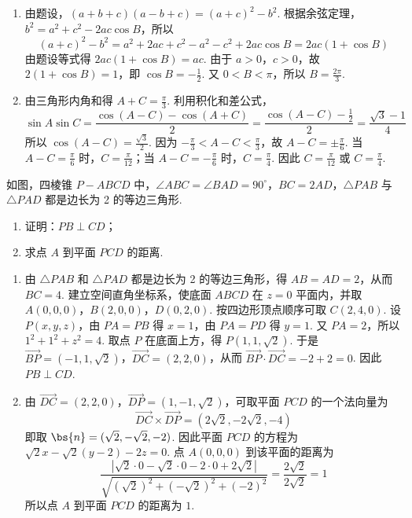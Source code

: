 \begin{solution}
\begin{enumerate}
\item 由题设，\((a+b+c)(a-b+c)=(a+c)^2-b^2\).
根据余弦定理，\(b^2=a^2+c^2-2ac\cos B\)，所以
\[
(a+c)^2-b^2=a^2+2ac+c^2-a^2-c^2+2ac\cos B=2ac(1+\cos B)
\]
由题设等式得 \(2ac(1+\cos B)=ac\).
由于 \(a>0\)，\(c>0\)，故 \(2(1+\cos B)=1\)，即 \(\cos B=-\frac{1}{2}\).
又 \(0<B<\pi\)，所以 \(B=\frac{2\pi}{3}\).

\item 由三角形内角和得 \(A+C=\frac{\pi}{3}\). 利用积化和差公式，
\[
\sin A\sin C=\frac{\cos(A-C)-\cos(A+C)}{2}=\frac{\cos(A-C)-\frac{1}{2}}{2}=\frac{\sqrt{3}-1}{4}
\]
所以 \(\cos(A-C)=\frac{\sqrt{3}}{2}\).
因为 \(-\frac{\pi}{3}<A-C<\frac{\pi}{3}\)，故 \(A-C=\pm\frac{\pi}{6}\).
当 \(A-C=\frac{\pi}{6}\) 时，\(C=\frac{\pi}{12}\)；当 \(A-C=-\frac{\pi}{6}\) 时，\(C=\frac{\pi}{4}\).
因此 \(C=\frac{\pi}{12}\) 或 \(C=\frac{\pi}{4}\).
\end{enumerate}
\end{solution}

\begin{problem}
如图，四棱锥 \(P - ABCD\) 中，\(\angle ABC = \angle BAD = 90^{\circ}\)，\(BC = 2AD\)，\(\triangle PAB\) 与 \(\triangle PAD\) 都是边长为 2 的等边三角形.

\begin{enumerate}
\item 证明：\(PB \perp CD\)；
\item 求点 \(A\) 到平面 \(PCD\) 的距离.
\end{enumerate}

\end{problem}

\begin{solution}
\begin{enumerate}
\item 由 \(\triangle PAB\) 和 \(\triangle PAD\) 都是边长为 2 的等边三角形，得 \(AB=AD=2\)，从而 \(BC=4\).
建立空间直角坐标系，使底面 \(ABCD\) 在 \(z=0\) 平面内，并取
\(A(0,0,0)\)，\(B(2,0,0)\)，\(D(0,2,0)\). 按四边形顶点顺序可取 \(C(2,4,0)\).
设 \(P(x,y,z)\)，由 \(PA=PB\) 得 \(x=1\)，由 \(PA=PD\) 得 \(y=1\).
又 \(PA=2\)，所以 \(1^2+1^2+z^2=4\). 取点 \(P\) 在底面上方，得 \(P(1,1,\sqrt{2})\).
于是 \(\overrightarrow{BP}=(-1,1,\sqrt{2})\)，\(\overrightarrow{DC}=(2,2,0)\)，从而
\(\overrightarrow{BP}\cdot\overrightarrow{DC}=-2+2=0\). 因此 \(PB\perp CD\).

\item 由 \(\overrightarrow{DC}=(2,2,0)\)，\(\overrightarrow{DP}=(1,-1,\sqrt{2})\)，可取平面 \(PCD\) 的一个法向量为
\[
\overrightarrow{DC}\times\overrightarrow{DP}=(2\sqrt{2},-2\sqrt{2},-4)
\]
即取 \(\bs{n}=(\sqrt{2},-\sqrt{2},-2)\).
因此平面 \(PCD\) 的方程为 \(\sqrt{2}x-\sqrt{2}(y-2)-2z=0\).
点 \(A(0,0,0)\) 到该平面的距离为
\[
\frac{|\sqrt{2}\cdot0-\sqrt{2}\cdot0-2\cdot0+2\sqrt{2}|}{\sqrt{(\sqrt{2})^2+(-\sqrt{2})^2+(-2)^2}}=\frac{2\sqrt{2}}{2\sqrt{2}}=1
\]
所以点 \(A\) 到平面 \(PCD\) 的距离为 \(1\).
\end{enumerate}
\end{solution}

